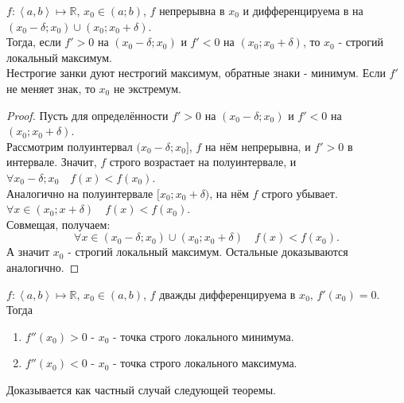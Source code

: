 \documentclass[11pt, oneside]{article}   	%
\begin{document}
    \begin{theorem}
        $f: \left<a, b\right> \mapsto \mathbb{R}$, $x_0\in (a; b)$, $f$ непрерывна в $x_0$ и дифференцируема в на $(x_0-\delta;x_0) \cup (x_0; x_0+\delta)$.\\
        Тогда, если
        $f'>0$ на $(x_0-\delta; x_0)$ и $f' < 0$ на $(x_0; x_0+\delta)$, то $x_0$ - строгий локальный максимум.\\
        Нестрогие занки дуют нестрогий максимум, обратные знаки - минимум.
        Если $f'$ не меняет знак, то $x_0$ не экстремум.
        \begin{proof}
            Пусть для определённости $f'>0$ на $(x_0-\delta; x_0)$ и $f'<0$ на $(x_0; x_0+\delta)$.\\
            Рассмотрим полуинтервал $(x_0-\delta; x_0]$, $f$ на нём непрерывна, и $f'>0$ в интервале. Значит, $f$ строго возрастает на полуинтервале, и $\forall{x_0-\delta; x_0}\quad f(x) < f(x_0)$.\\
            Аналогично на полуинтервале $[x_0; x_0+\delta)$, на нём $f$ строго убывает. $\forall{x\in (x_0; x+\delta)}\quad f(x) < f(x_0)$.\\
            Совмещая, получаем:
            \[ \forall{x\in (x_0-\delta; x_0)\cup (x_0; x_0+\delta)}\quad f(x) < f(x_0)  .\]
            А значит $x_0$ - строгий локальный максимум. Остальные доказываются аналогично.
        \end{proof}
    \end{theorem}
    \begin{theorem}
        $f: \left<a, b\right> \mapsto \mathbb{R}$, $x_0\in (a, b)$, $f$ дважды дифференцируема в $x_0$, $f'(x_0) = 0$.\\
        Тогда
        \begin{enumerate}
            \item $f''(x_0) > 0$ - $x_0$ - точка строго локального минимума.
            \item $f''(x_0) < 0$ - $x_0$ - точка строго локального максимума.
        \end{enumerate}
        Доказывается как частный случай следующей теоремы.
    \end{theorem}
\end{document}
